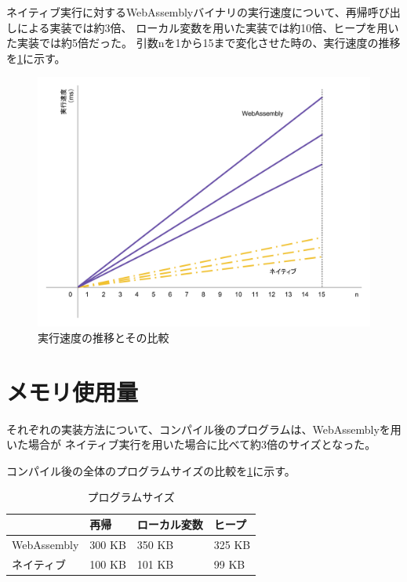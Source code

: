 ネイティブ実行に対するWebAssemblyバイナリの実行速度について、再帰呼び出しによる実装では約3倍、
ローカル変数を用いた実装では約10倍、ヒープを用いた実装では約5倍だった。
引数nを1から15まで変化させた時の、実行速度の推移を\ref{fig:exec_time}に示す。

\begin{figure}[htbp]
  \caption{実行速度の推移とその比較}
  \label{fig:exec_time}
  \begin{center}
    \includegraphics[bb=0 0 800 600,width=12cm]{img/exec_time.pdf}
  \end{center}
\end{figure}

\section{メモリ使用量}

それぞれの実装方法について、コンパイル後のプログラムは、WebAssemblyを用いた場合が
ネイティブ実行を用いた場合に比べて約3倍のサイズとなった。

コンパイル後の全体のプログラムサイズの比較を\ref{tb:program_size}に示す。

\begin{table}[]
  \caption{プログラムサイズ}
  \label{tb:program_size}
  \begin{center}
    \begin{tabular}{|l|l|l|l|}
      \hline
      & 再帰 & ローカル変数 & ヒープ \\ \hline
      WebAssembly & 300 KB & 350 KB & 325 KB \\ \hline
      ネイティブ & 100 KB & 101 KB & 99 KB \\ \hline
    \end{tabular}
  \end{center}
\end{table}

